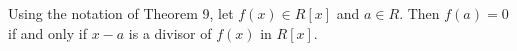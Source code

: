 Using the notation of Theorem 9, let $f(x) \in R[x]$ and $a \in R$. Then $f(a) = 0$ if and only if $x - a$ is a divisor of $f(x)$ in $R[x]$.
